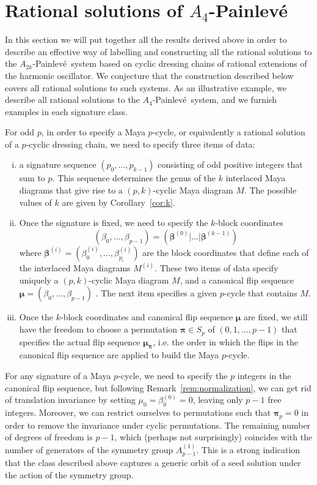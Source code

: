 \documentclass[10pt]{amsart}
\theoremstyle{definition}
\numberwithin{equation}{section}
\numberwithin{figure}{section}
\newcommand{\bbeta}{{\boldsymbol{\beta}}}
\newcommand{\bmu}{{\boldsymbol{\mu}}}
\newcommand{\bpi}{{\boldsymbol{\pi}}}
\newcommand{\p}{Painlev\'{e}}
\begin{document}
\section{Rational solutions of $A_4$-\p}\label{sec:A4}

In this section we will put together all the results derived above in order to describe an effective way of labelling and constructing all the rational solutions to the $A_{2k}$-\p\ system based on cyclic dressing chains of rational extensions of the harmonic oscillator. We conjecture that the construction described below covers all rational solutions to such systems. As an illustrative example, we describe all rational solutions to the $A_4$-\p\ system, and we furnish examples in each signature class.

For odd $p$, in order to specify a Maya $p$-cycle, or equivalently a rational solution of a $p$-cyclic dressing chain, we need to specify three items of data:
\begin{enumerate}[(i)]
\item a signature sequence $(p_0,\ldots, p_{k-1})$ consisting of odd positive integers that sum to $p$. This sequence determines the genus of the $k$ interlaced Maya diagrams that give rise to a $(p,k)$-cyclic Maya diagram $M$. The possible values of $k$ are given by Corollary~\ref{cor:k}.
\item Once the signature is fixed, we need to specify the $k$-block coordinates \[(\beta_0,\dots,\beta_{p-1})=(\bbeta^{(0)}|\ldots| \bbeta^{(k-1)})\] where $\bbeta^{(i)}=(\beta^{(i)}_0,\dots,\beta^{(i)}_{p_i})$ are the block coordinates that define each of the interlaced Maya diagrams $M^{(i)}$. These two items of data specify uniquely a $(p,k)$-cyclic Maya diagram $M$, and a canonical flip sequence $\bmu=(\beta_0,\dots,\beta_{p-1})$ . The next item specifies a given $p$-cycle that contains $M$.
\item Once the $k$-block coordinates and canonical flip sequence $\bmu$ are fixed, we still have the freedom to choose a permutation  $\bpi\in S_p$ of $(0,1,\ldots, p-1)$ that specifies the actual flip sequence $\bmu_\bpi$, i.e. the order in which the flips in the canonical flip sequence are applied to build the Maya $p$-cycle.

\end{enumerate}

For any signature of a Maya $p$-cycle, we need to specify the $p$ integers in the canonical flip sequence, but following Remark~\ref{rem:normalization}, we can get rid of translation invariance by setting $\mu_0=\beta^{(0)}_0=0$, leaving only $p-1$ free integers. Moreover, we can restrict ourselves to permutations such that $\bpi_p=0$ in order to remove the invariance under cyclic permutations. The remaining number of degrees of freedom is $p-1$, which (perhaps not surprisingly) coincides with the number of generators of the symmetry group $A^{(1)}_{p-1}$. This is a strong indication that the class described above captures a generic orbit of a seed solution under the action of the symmetry group.
\end{document}
